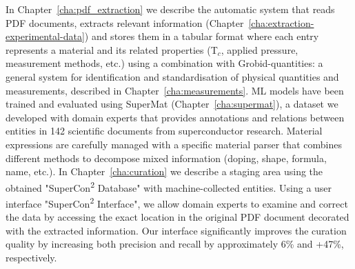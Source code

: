 \documentclass[a4paper,11pt]{report}
\newcommand{\tc}{T$_{c}$}
\begin{document}
In Chapter~\ref{cha:pdf_extraction} we describe the automatic system that reads PDF documents, extracts relevant information (Chapter~\ref{cha:extraction-experimental-data}) and stores them in a tabular format where each entry represents a material and its related properties (\tc, applied pressure, measurement methods, etc.) using a combination with Grobid-quantities: a general system for identification and standardisation of physical quantities and measurements, described in Chapter~\ref{cha:measurements}.
ML models have been trained and evaluated using SuperMat (Chapter~\ref{cha:supermat}), a dataset we developed with domain experts that provides annotations and relations between entities in 142 scientific documents from superconductor research.
Material expressions are carefully managed with a specific material parser that combines different methods to decompose mixed information (doping, shape, formula, name, etc.). 
In Chapter~\ref{cha:curation} we describe a staging area using the obtained "SuperCon\textsuperscript{2} Database" with machine-collected entities. Using a user interface "SuperCon\textsuperscript{2} Interface", we allow domain experts to examine and correct the data by accessing the exact location in the original PDF document decorated with the extracted information. 
Our interface significantly improves the curation quality by increasing both precision and recall by approximately 6\% and +47\%, respectively.


\newpage

{}



\newpage

{}

\end{document}
